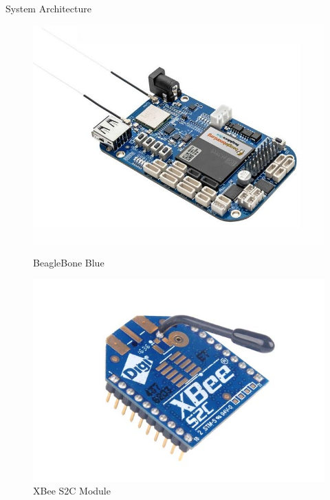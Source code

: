 \documentclass{beamer}
\begin{document}
\begin{frame}{System Architecture}
\begin{figure}
\begin{minipage}[t]{0.32\textwidth}
          \includegraphics[width=1\textwidth]{figs/img/beaglebone_blue}
          \caption{BeagleBone Blue}
      \end{minipage}
      \begin{minipage}[t]{0.32\textwidth}
          \includegraphics[width=1\textwidth]{figs/img/Xbee-S2C-Module}
          \caption{XBee S2C Module}
      \end{minipage}
    \end{figure}
\end{frame}

\end{document}
